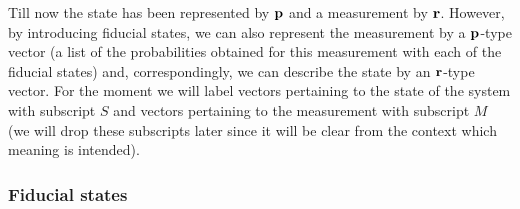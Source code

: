 \documentclass[10pt,twocolumn]{article}
\begin{document}
Till now the state has been represented by ${\bf p}$ and a measurement
by ${\bf r}$.  However, by introducing fiducial states, we
can also represent the measurement by a ${\bf
p}$-type vector (a list of the probabilities obtained for this
measurement with each of the fiducial states) and, correspondingly, we
can describe the state by an ${\bf r}$-type vector.
For the moment we will label vectors pertaining to the state of the
system with subscript $S$ and vectors pertaining to the measurement with
subscript $M$ (we will drop these subscripts later since it will be
clear from the context which meaning is intended).

\subsubsection{Fiducial states}
\end{document}
